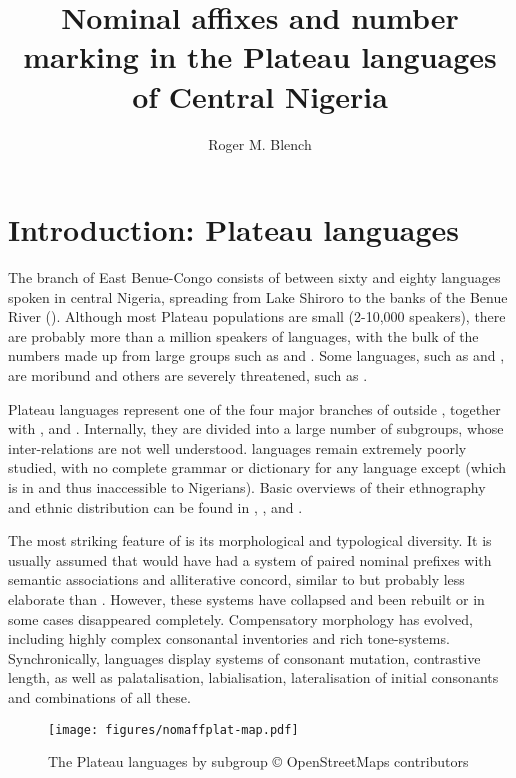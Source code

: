 \documentclass[output=paper]{langsci/langscibook}
\author{Roger M. Blench\affiliation{McDonald Institute for Archaeological Research, University of Cambridge}}
\title{Nominal affixes and number marking in the Plateau languages of Central Nigeria }
\begin{document}
  
 
\label{sec:4}
\section{Introduction: Plateau languages} %

The  branch of East Benue-Congo consists of between sixty and eighty languages spoken in central Nigeria, spreading from Lake Shiroro to the banks of the Benue River (). Although most Plateau populations are small (2-10,000 speakers), there are probably more than a million speakers of  languages, with the bulk of the numbers made up from large groups such as  and . Some  languages, such as  and , are moribund and others are severely threatened, such as . 

Plateau languages represent one of the four major branches of  outside , together with ,  and . Internally, they are divided into a large number of subgroups, whose inter-relations are not well understood.  languages remain extremely poorly studied, with no complete grammar or dictionary for any language except  (which is in  and thus inaccessible to Nigerians). Basic overviews of their ethnography and ethnic distribution can be found in \citet{Temple1922}, \citet{Meek1925,Meek1931}, \citet{Gunn1953,Gunn1956} and \citet{CrozierBlench1992}.

The most striking feature of  is its morphological and typological diversity. It is usually assumed that  would have had a system of paired nominal prefixes with semantic associations and alliterative concord, similar to but probably less elaborate than . However, these systems have collapsed and been rebuilt or in some cases disappeared completely. Compensatory morphology has evolved, including highly complex consonantal inventories and rich tone-systems. Synchronically,  languages display systems of consonant mutation, contrastive length, as well as palatalisation, labialisation, lateralisation of initial consonants and combinations of all these.
  
\begin{figure}  
\texttt{[image: figures/nomaffplat-map.pdf]}
\caption{The Plateau languages by subgroup \hfill {\tiny © OpenStreetMaps contributors}}
\label{fig:nomaffplat:1}
\end{figure} 
\end{document}
